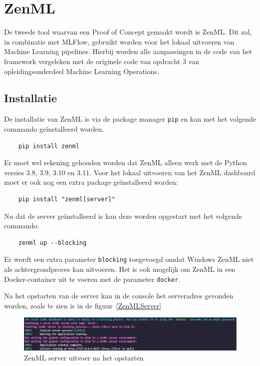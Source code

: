 \section{ZenML}
De tweede tool waarvan een Proof of Concept gemaakt wordt is ZenML. Dit zal, in combinatie met MLFlow, gebruikt worden voor het lokaal uitvoeren van Machine Learning pipelines. Hierbij worden alle aanpassingen in de code van het framework vergeleken met de originele code van opdracht 3 van opleidingsonderdeel Machine Learning Operations.

\subsection{Installatie}
De installatie van ZenML is via de package manager \texttt{pip} en kan met het volgende commando geïnstalleerd worden.
\begin{verbatim}
    pip install zenml
\end{verbatim}
Er moet wel rekening gehouden worden dat ZenML alleen werk met de Python versies 3.8, 3.9, 3.10 en 3.11.
Voor het lokaal uitvoeren van het ZenML dashboard moet er ook nog een extra package geïnstalleerd worden:
\begin{verbatim}
    pip install "zenml[server]"
\end{verbatim}

Nu dat de server geïnstalleerd is kan deze worden opgestart met het volgende commando: 
\begin{verbatim}
    zenml up --blocking
\end{verbatim}
Er wordt een extra parameter \texttt{blocking} toegevoegd omdat Windows ZenML niet als achtergrondproces kan uitvoeren. Het is ook mogelijk om ZenML in een Docker-container uit te voeren met de parameter \texttt{docker}.

Na het opstarten van de server kan in de console het serveradres gevonden worden, zoals te zien is in de figuur~\ref{ZenMLServer}
\begin{figure}
    \centering
    \includegraphics[width=0.9\linewidth]{graphics/ZenML_Server.PNG}
    \caption{ZenML server uitvoer na het opstarten}
    \label{fig:ZenMLServer}
\end{figure}
